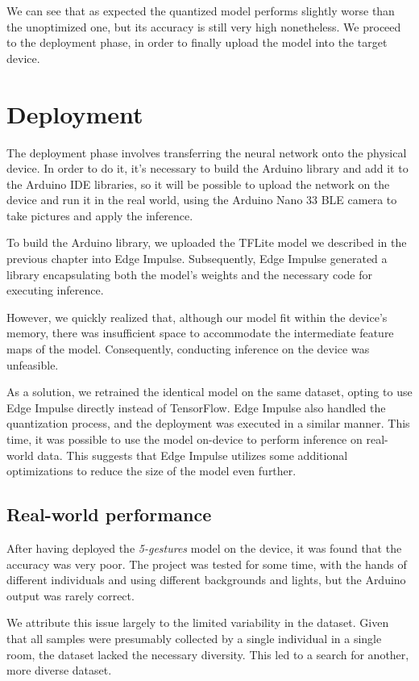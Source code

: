 \documentclass{Configuration_Files/PoliMi3i_thesis}
\begin{document}
We can see that as expected the quantized model performs slightly worse than the unoptimized one, but its accuracy is still very high nonetheless. We proceed to the deployment phase, in order to finally upload the model into the target device.


\chapter{Deployment}
\label{ch:deployment}%
The deployment phase involves transferring the neural network onto the physical device.
In order to do it, it's necessary to build the Arduino library and add it to the Arduino IDE libraries, so it will be possible to upload the network on the device and run it in the real world, using the Arduino Nano 33 BLE camera to take pictures and apply the inference.

To build the Arduino library, we uploaded the TFLite model we described in the previous chapter into Edge Impulse. Subsequently, Edge Impulse generated a library encapsulating both the model's weights and the necessary code for executing inference. 

However, we quickly realized that, although our model fit within the device's memory, there was insufficient space to accommodate the intermediate feature maps of the model. Consequently, conducting inference on the device was unfeasible.

As a solution, we retrained the identical model on the same dataset, opting to use Edge Impulse directly instead of TensorFlow. Edge Impulse also handled the quantization process, and the deployment was executed in a similar manner. This time, it was possible to use the model on-device to perform inference on real-world data. This suggests that Edge Impulse utilizes some additional optimizations to reduce the size of the model even further.


\section{Real-world performance}
\label{sec:real_word_perf}
After having deployed the \textit{5-gestures} model on the device, it was found that the accuracy was very poor. The project was tested for some time, with the hands of different individuals and using different backgrounds and lights, but the Arduino output was rarely correct. 

We attribute this issue largely to the limited variability in the dataset. Given that all samples were presumably collected by a single individual in a single room, the dataset lacked the necessary diversity. This led to a search for another, more diverse dataset. 
\end{document}
